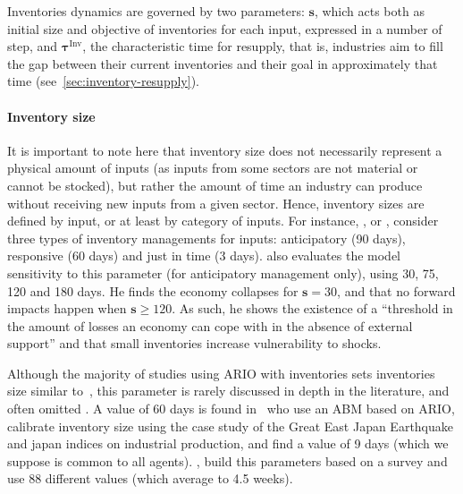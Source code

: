 \documentclass[main.tex]{subfiles}
\begin{document}
Inventories dynamics are governed by two parameters: $\bm{s}$, which acts both
as initial size and objective of inventories for each input, expressed in a
number of step, and $\bm{\tau}^{\textrm{Inv}}$, the characteristic time for resupply,
that is, industries aim to fill the gap between their current inventories and
their goal in approximately that time (see~\cref{sec:inventory-resupply}).

\paragraph{Inventory size}
\label{sec:inventory-size}

It is important to note here that inventory size does not necessarily represent
a physical amount of inputs (as inputs from some sectors are not material or
cannot be stocked), but rather the amount of time an industry can produce
without receiving new inputs from a given sector. Hence, inventory sizes are
defined by input, or at least by category of inputs. For instance,
\textcite{hallegatte-2013-model-role}, or
\textcite{okuyama-2004-model-spatial}, consider three types of
inventory managements for inputs: anticipatory (90 days), responsive (60 days)
and just in time (3 days). \Textcite{hallegatte-2013-model-role}
also evaluates the model sensitivity to this parameter (for anticipatory
management only), using 30, 75, 120 and 180 days. He finds the economy
collapses for $\bm{s}=30$, and that no forward impacts happen when $\bm{s} \geq
120$. As such, he shows the existence of a ``threshold in the amount of losses
an economy can cope with in the absence of external support'' and that small
inventories increase vulnerability to shocks.

Although the majority of studies using ARIO with inventories sets inventories
size similar to~\textcite{hallegatte-2013-model-role}, this parameter
is rarely discussed in depth in the literature, and often omitted
\parencite{zhang-2021-analy-impac, zhang-2017-asses-rippl, wang-2020-econom-footp, huang-2022-estim-poten}. A value of 60 days is found in~\textcite{avelino-2019-chall-estim}
\Textcite{inoue-2018-firm-simul} who use an \acrshort{ABM}
based on ARIO, calibrate inventory size using the case study of the Great East
Japan Earthquake and japan indices on industrial production, and find a value of
9 days (which we suppose is common to all agents). \Textcite{colon-2020-fragm-produc, colon-2019-trans-suppl}, build this parameters based on a survey
and use 88 different values (which average to 4.5 weeks).
\end{document}
